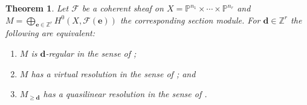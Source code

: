 \documentclass[11pt,reqno]{amsart}
\newtheorem{theorem}[lemma]{Theorem}
\theoremstyle{remark}
\newcommand{\dd}{\mathbf{d}}
\newcommand{\ee}{\mathbf{e}}
\newcommand{\PP}{\mathbb{P}}
\newcommand{\ZZ}{\mathbb{Z}}
\newcommand{\cF}{\mathcal{F}}
\begin{document}
%

\begin{theorem}\cite[Theorem A]{bruceHellerSayrafi26}\label{thm:mgreg-main}
Let $\cF$ be a coherent sheaf on $X=\PP^{n_1}\times \cdots \times \PP^{n_r}$ and $M=\bigoplus_{\ee\in\ZZ^r} H^0(X,\cF(\ee))$ the corresponding section module. For $\dd \in \ZZ^r$ the following are equivalent: 
\begin{enumerate}
\item $M$ is $\dd$-regular in the sense of \cite{maclaganSmith04};
\item $M$ has a virtual resolution in the sense of \cite{BES20}; and
\item $M_{\geq \dd}$ has a quasilinear resolution in the sense of \cite{bruceHellerSayrafi26}.
\end{enumerate}
\end{theorem}
\end{document}
